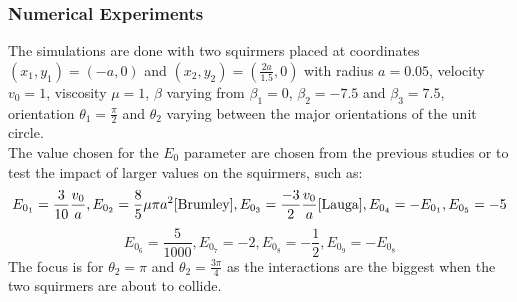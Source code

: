 \documentclass{article}
\begin{document}
\subsubsection{Numerical Experiments}
The simulations are done with two squirmers placed at coordinates $(x_1, y_1) = (-a, 0)$ and $(x_2, y_2) = (\frac{2a}{1.5}, 0)$ with radius $a=0.05$, velocity $v_0=1$, viscosity $\mu = 1$, $\beta$ varying from $\beta_1 = 0$,
 $\beta_2 = -7.5$ and $\beta_3 = 7.5$, orientation $\theta_1 = \frac{\pi}{2}$ and $\theta_2$ varying between the major orientations of the unit circle.\\
 The value chosen for the $E_0$ parameter are chosen from the previous studies or to test the impact of larger values on the squirmers, such as:
 $$
 E_{0_{1}} = \frac{3}{10}\frac{v_0}{a}, E_{0_{2}} = \frac{8}{5}\mu\pi a^2 \cite{Brumley}, E_{0_{3}} = \frac{-3}{2}\frac{v_0}{a} \cite{Lauga},
 E_{0_{4}} = -E_{0_{1}}, E_{0_{5}} = -5$$
 $$
 E_{0_{6}} = \frac{5}{1000}, E_{0_{7}} = -2, E_{0_{8}} = -\frac{1}{2}, E_{0_{9}} = -E_{0_{8}}
 $$
The focus is for $\theta_2 = \pi$ and $\theta_2 = \frac{3\pi}{4}$ as the interactions are the biggest when the two squirmers are about to collide.
\end{document}
